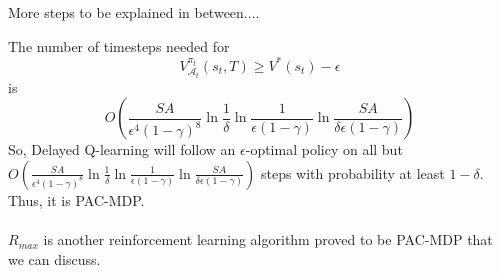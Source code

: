 \documentclass[10pt]{article}
\begin{document}
More steps to be explained in between....

The number of timesteps needed for 
$$V_{\mathcal{A}_t}^{\pi_t}(s_t,T) \geq V^*(s_t)-\epsilon$$
is 
$$O\left(\frac{SA}{\epsilon^4(1-\gamma)^8}\ln{\frac{1}{\delta}}\ln{\frac{1}{\epsilon(1-\gamma)}}\ln{\frac{SA}{\delta\epsilon(1-\gamma)}}\right)$$
So, Delayed Q-learning will follow an $\epsilon$-optimal policy on all but $O\left(\frac{SA}{\epsilon^4(1-\gamma)^8}\ln{\frac{1}{\delta}}\ln{\frac{1}{\epsilon(1-\gamma)}}\ln{\frac{SA}{\delta\epsilon(1-\gamma)}}\right)$ steps with probability at least $1-\delta$.  Thus, it is PAC-MDP.
\\ 
\\
$R_{max}$ is another reinforcement learning algorithm proved to be PAC-MDP that we can discuss.

\nocite{yang_multiagent_2004}
\nocite{kim_autonomous_2003}

\newpage
{}





\end{document}
